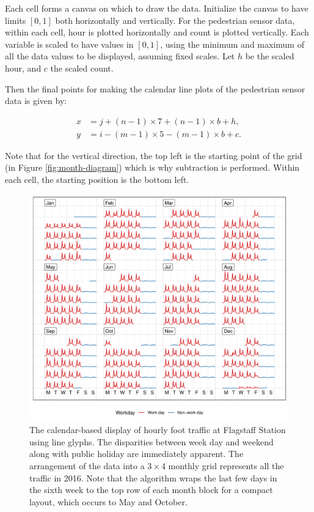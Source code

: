 \documentclass[12pt]{article}
\begin{document}
Each cell forms a canvas on which to draw the data. Initialize the canvas to have limits \([0, 1]\) both horizontally and vertically. For the pedestrian sensor data, within each cell, hour is plotted horizontally and count is plotted vertically. Each variable is scaled to have values in \([0, 1]\), using the minimum and maximum of all the data values to be displayed, assuming fixed scales. Let \(h\) be the scaled hour, and \(c\) the scaled count.

Then the final points for making the calendar line plots of the pedestrian sensor data is given by:

\begin{equation}
  \begin{aligned}
  x &= j + (n - 1) \times 7 + (n - 1) \times b + h, \\
  y &= i - (m - 1) \times 5 - (m - 1) \times b + c.
  \end{aligned}
  \label{eq:final}
\end{equation}

Note that for the vertical direction, the top left is the starting point of the grid (in Figure \ref{fig:month-diagram}) which is why subtraction is performed. Within each cell, the starting position is the bottom left.

\begin{figure}

{\centering \includegraphics[width=\textwidth]{figure/fs-2016-1} 

}

\caption{The calendar-based display of hourly foot traffic at Flagstaff Station using line glyphs. The disparities between week day and weekend along with public holiday are immediately apparent. The arrangement of the data into a \(3 \times 4\) monthly grid represents all the traffic in 2016. Note that the algorithm wraps the last few days in the sixth week to the top row of each month block for a compact layout, which occurs to May and October.}\label{fig:fs-2016}
\end{figure}
\end{document}

